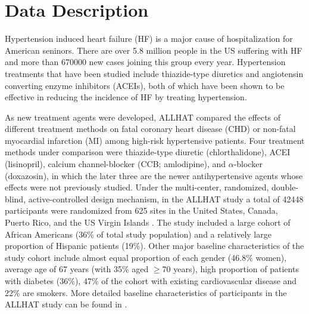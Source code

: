 




% 
\section{Data Description}\label{sec:data}

Hypertension induced heart failure (HF) is a major cause of hospitalization for American seninors. There are over 5.8 million people in the US suffering with HF and more than 670000 new cases joining this group every year. Hypertension treatments that have been studied include thiazide-type diuretics and angiotensin converting enzyme inhibitors (ACEIs), both of which have been shown to be effective in reducing the incidence of HF by treating hypertension.

As new treatment agents were developed, ALLHAT compared the effects of different treatment methods on fatal coronary heart disease (CHD) or non-fatal myocardial infarction (MI) among high-risk hypertensive patients. Four treatment methods under comparison were thiazide-type diuretic (chlorthalidone), ACEI (lisinopril), calcium channel-blocker (CCB; amlodipine), and $\alpha$-blocker (doxazosin), in which the later three are the newer antihypertensive agents whose effects were not previously studied. Under the multi-center, randomized, double-blind, active-controlled design mechanism, in the ALLHAT study a total of 42448 participants were randomized from 625 sites in the United States, Canada, Puerto Rico, and the US Virgin Islands \citep{grimm2001baseline}. The study included a large cohort of African Americans (36\% of total study population) and a relatively large proportion of Hispanic patients (19\%). Other major baseline characteristics of the study cohort include almost equal proportion of each gender (46.8\% women), average age of 67 years (with 35\% aged $\ge$70 years), high proportion of patients with diabetes (36\%), 47\% of the cohort with existing cardiovascular disease and 22\% are smokers. More detailed baseline characteristics of participants in the ALLHAT study can be found in \cite{grimm2001baseline}.\par

